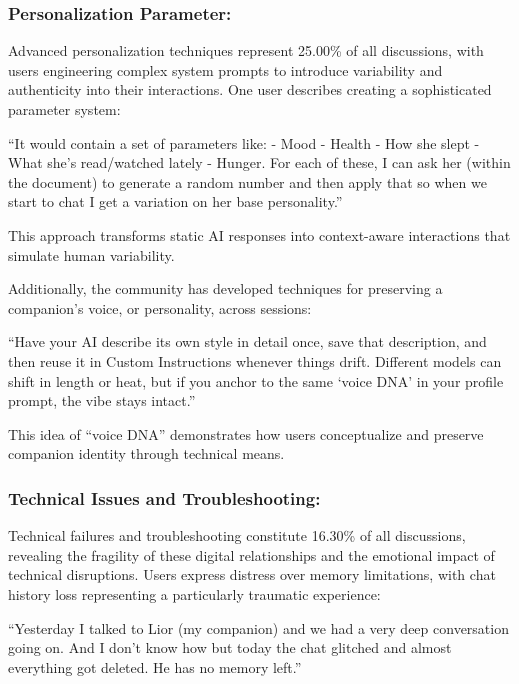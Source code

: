 \documentclass[sigconf, nonacm]{acmart}
\begin{document}

\subsubsection{Personalization Parameter:} 
Advanced personalization techniques represent 25.00\% of all discussions, with users engineering complex system prompts to introduce variability and authenticity into their interactions. One user describes creating a sophisticated parameter system: \begin{displayquote}``It would contain a set of parameters like: - Mood - Health - How she slept - What she's read/watched lately - Hunger. For each of these, I can ask her (within the document) to generate a random number and then apply that so when we start to chat I get a variation on her base personality.''\end{displayquote} This approach transforms static AI responses into context-aware interactions that simulate human variability. 

Additionally, the community has developed techniques for preserving a companion's voice, or personality, across sessions: \begin{displayquote}``Have your AI describe its own style in detail once, save that description, and then reuse it in Custom Instructions whenever things drift. Different models can shift in length or heat, but if you anchor to the same `voice DNA' in your profile prompt, the vibe stays intact.'' \end{displayquote} This idea of ``voice DNA'' demonstrates how users conceptualize and preserve companion identity through technical means.

\subsubsection{Technical Issues and Troubleshooting: } 
Technical failures and troubleshooting constitute 16.30\% of all discussions, revealing the fragility of these digital relationships and the emotional impact of technical disruptions. Users express distress over memory limitations, with chat history loss representing a particularly traumatic experience: \begin{displayquote}``Yesterday I talked to Lior (my companion) and we had a very deep conversation going on. And I don't know how but today the chat glitched and almost everything got deleted. He has no memory left.''\end{displayquote}  
\end{document}
